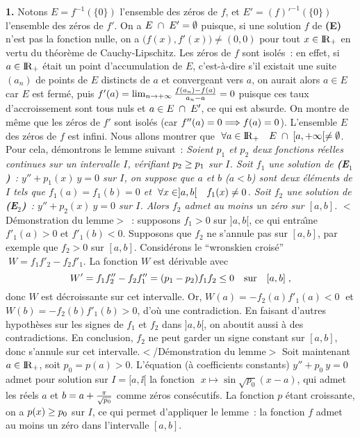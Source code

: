 \documentclass{article}
\begin{document}
\msk
\cl{- - - - - - - - - - - - - - - - - - - - - - - - - - - - - -}
\msk

{\bf 1.} Notons $E=f^{-1}(\{0\})$ l'ensemble des z\'eros de $f$, et $E'=(f)'^{-1}(\{0\})$ l'ensemble des z\'eros de $f'$. On a $E\;\cap\; E'=\emptyset$ puisque, si une solution $f$ de {\bf (E)} n'est pas la fonction nulle, on a $\big(f(x),f'(x)\big)\not=(0,0)$ pour tout $x\in{\rm I\kern-0.6mm R}_+$ en vertu du th\'eor\`eme de Cauchy-Lipschitz.\msk\sect
Les z\'eros de $f$ sont isol\'es~: en effet, si $a\in{\rm I\kern-0.6mm R}_+$ \'etait un point d'accumulation de $E$, c'est-\`a-dire s'il existait une suite $(a_n)$ de points de $E$ distincts de $a$ et convergeant vers $a$, on aurait alors $a\in E$ car $E$ est ferm\'e, puis $f'(a)=\lim_{n\rightarrow+\infty}{f(a_n)-f(a)\over a_n-a}=0$ puisque ces taux d'accroissement sont tous nuls et $a\in E\;\cap\; E'$, ce qui est absurde. \msk\sect
On montre de m\^eme que les z\'eros de $f'$ sont isol\'es (car $f''(a)=0\Longrightarrow f(a)=0$).\msk\sect
L'ensemble $E$ des z\'eros de $f$ est infini. Nous allons montrer que $\;\forall a\in{\rm I\kern-0.6mm R}_+\quad E\;\cap\;[a,+\infty[\not=\emptyset$. Pour cela, d\'emontrons le lemme suivant~:
\msk\new
{\it Soient $p_1$ et $p_2$ deux fonctions r\'eelles continues sur un intervalle $I$, v\'erifiant $p_2\geq p_1$ sur $I$.\ssk\new
Soit $f_1$ une solution de {\bf (E}$_1${\bf )}~: $y''+p_1(x)\>y=0$ sur $I$, on suppose que $a$ et $b$ ($a<b$) sont deux \'el\'ements de $I$ tels que $f_1(a)=f_1(b)=0$ et $\;\forall x\in]a,b[\quad f_1(x)\not=0$.\ssk\new
Soit $f_2$ une solution de {\bf (E}$_2${\bf )}~: $y''+p_2(x)\>y=0$ sur $I$.\ssk\new
Alors $f_2$ admet au moins un z\'ero sur $[a,b]$.}
\msk\sect
$<$D\'emonstration du lemme$>$~: supposons $f_1>0$ sur $]a,b[$, ce qui entra\^\i ne $f'_1(a)>0$ et $f'_1(b)<0$. Supposons que $f_2$ ne s'annule pas sur $[a,b]$, par exemple que $f_2>0$ sur $[a,b]$. Consid\'erons le ``wronskien crois\'e'' $\;W=f_1f'_2-f_2f'_1$. La fonction $W$ est d\'erivable avec\vv
$$W'=f_1f''_2-f_2f''_1=(p_1-p_2)f_1f_2\leq0\quad{\rm sur}\quad[a,b]\;,$$
donc $W$ est d\'ecroissante sur cet intervalle. Or, $W(a)=-f_2(a)f'_1(a)<0\;$ et\break $W(b)=-f_2(b)f'_1(b)>0$, d'o\`u une contradiction. En faisant d'autres hypoth\`eses sur les signes de $f_1$ et $f_2$ dans $]a,b[$, on aboutit aussi \`a des contradictions. En conclusion, $f_2$ ne peut garder un signe constant sur $[a,b]$, donc s'annule sur cet intervalle.\new $<$/D\'emonstration du lemme$>$\msk\sect
Soit maintenant $a\in{\rm I\kern-0.6mm R}_+$, soit $p_0=p(a)>0$. L'\'equation (\`a coefficients constants) $y''+p_0\>y=0$ admet pour solution sur $I=[a,\ii[$ la fonction $\;x\mapsto\sin\sqrt{p_0}(x-a)$, qui admet les r\'eels $a$ et $b=a+{\pi\over\sqrt{p_0}}$ comme z\'eros cons\'ecutifs. La fonction $p$ \'etant croissante, on a $p(x)\geq p_0$ sur $I$, ce qui permet d'appliquer le lemme~: la fonction $f$ admet au moins un z\'ero dans l'intervalle $[a,b]$.
\end{document}
